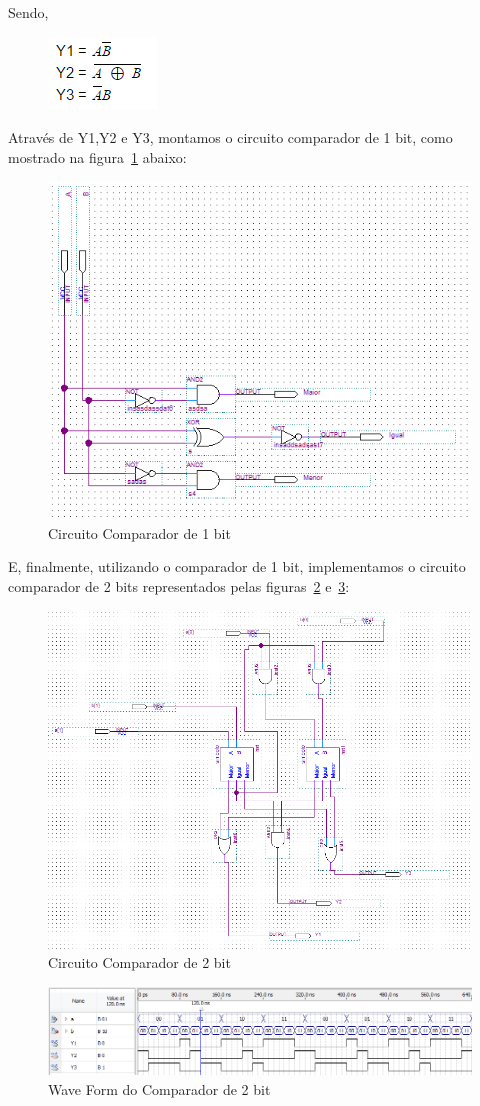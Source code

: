 \documentclass[12pt]{article}
\begin{document}
Sendo,
\begin{figure}[H]
	\centering
	\includegraphics[width=.2\textwidth]{p2el.png}
\end{figure}

Através de Y1,Y2 e Y3, montamos o circuito comparador de 1 bit, como mostrado na figura~\ref{fig:cc1} abaixo:
\begin{figure}[H]
	\centering
	\includegraphics[width=.7\textwidth]{cc1bit2.png}
	\caption{Circuito Comparador de 1 bit}
	\label{fig:cc1}
\end{figure}

E, finalmente, utilizando o comparador de 1 bit, implementamos o circuito comparador de 2 bits representados pelas figuras~\ref{fig:cc2} e~\ref{fig:wf2}:

\begin{figure}[H]
	\centering
	\includegraphics[width=.7\textwidth]{cc2b.png}
	\caption{Circuito Comparador de 2 bit}
	\label{fig:cc2}
\end{figure}
\begin{figure}[H]
	\centering
	\includegraphics[width=.7\textwidth]{wf2b.png}
	\caption{Wave Form do Comparador de 2 bit}
	\label{fig:wf2}
\end{figure}
\end{document}

